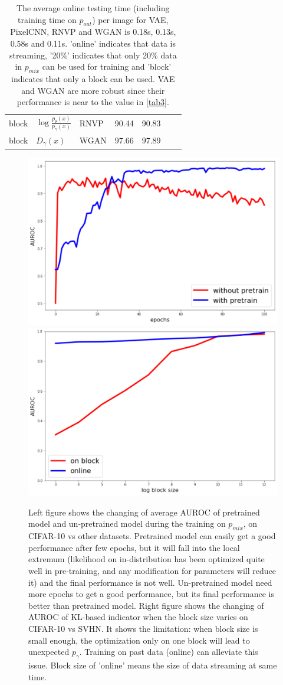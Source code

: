 \documentclass[letterpaper]{article} %
\newcommand{\pout}{p_{out}}
\newcommand{\pmix}{p_{mix}}
\begin{document}
\begin{table}[htbp]
\begin{tabular}{lllllll}
block & $\log \frac{p_\theta(x)}{p_\gamma(x)}$ & RNVP & 90.44 & 90.83 \\
block & $D_\gamma(x)$ & WGAN & 97.66 & 97.89 \\
\bottomrule
\end{tabular}
\caption{The average online testing time (including training time on $\pout$) per image for VAE, PixelCNN, RNVP and WGAN is 0.18s, 0.13s, 0.58s and 0.11s. 'online' indicates that data is streaming, '20\%' indicates that only 20\% data in $\pmix$ can be used for training and 'block' indicates that only a block can be used. VAE and WGAN are more robust since their performance is near to the value in \cref{tab3}. }
\label{tab4}
\end{table}

\begin{figure}[t]
\centering
\includegraphics[width=0.45\columnwidth]{auroc_during_training}
\includegraphics[width=0.45\columnwidth]{auroc_during_batch}
\caption{Left figure shows the changing of average AUROC of pretrained model and un-pretrained model during the training on $\pmix$, on CIFAR-10 vs other datasets. Pretrained model can easily get a good performance after few epochs, but it will fall into the local extremum (likelihood on in-distribution has been optimized quite well in pre-training, and any modification for parameters will reduce it) and the final performance is not well. Un-pretrained model need more epochs to get a good performance, but its final performance is better than pretrained model. 
Right figure shows the changing of AUROC of KL-based indicator when the block size varies on CIFAR-10 vs SVHN. It shows the limitation: when block size is small enough, the optimization only on one block will lead to unexpected $p_\gamma$. Training on past data (online) can alleviate this issue. Block size of 'online' means the size of data streaming at same time. }
\label{fig6}
\end{figure}
\end{document}
